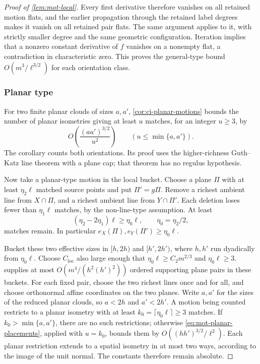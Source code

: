 \begin{proof}[Proof of \cref{lem:mot-local}]
Every first derivative therefore vanishes on all retained motion flats, and the earlier propagation through the retained label degrees makes it vanish on all retained pair flats.  The same argument applies to it, with strictly smaller degree and the same geometric configuration.  Iteration implies that a nonzero constant derivative of $f$ vanishes on a nonempty flat, a contradiction in characteristic zero.  This proves the general-type bound $O(m^3/\ell^{3/2})$ for each orientation class.

\subsubsection{Planar type}

For two finite planar clouds of sizes $a,a'$, \cref{cor:ci-planar-motions} bounds the number of planar isometries giving at least $u$ matches, for an integer $u\ge3$, by
\begin{equation}
\label{eq:mot-planar-placements}
 O\left(\frac{(aa')^{3/2}}{u^2}\right)
 \qquad (u\le\min\{a,a'\}).
\end{equation}
The corollary counts both orientations.  Its proof uses the higher-richness Guth--Katz line theorem \cite[Theorem~4.5]{guthkatz2015} with a plane cap; that theorem has no regulus hypothesis.

Now take a planar-type motion in the local bucket.  Choose a plane $\Pi$ with at least $\eta_2\ell$ matched source points and put $\Pi'=g\Pi$.  Remove a richest ambient line from $X\cap\Pi$, and a richest ambient line from $Y\cap\Pi'$. Each deletion loses fewer than $\eta_1\ell$ matches, by the non-line-type assumption.  At least
\[
 (\eta_2-2\eta_1)\ell\ge\eta_0\ell,
 \qquad \eta_0=\eta_2/2,
\]
matches remain.  In particular $e_X(\Pi),e_Y(\Pi')\ge\eta_0\ell$.

Bucket these two effective sizes in $[h,2h)$ and $[h',2h')$, where $h,h'$ run dyadically from $\eta_0\ell$. Choose $C_{\mathrm{loc}}$ also large enough that $\eta_0\ell\ge C_2m^{2/3}$ and $\eta_0\ell\ge3$.  supplies at most $O(m^4/(h^2(h')^2))$ ordered supporting plane pairs in these buckets.  For each fixed pair, choose the two richest lines once and for all, and choose orthonormal affine coordinates on the two planes.  Write $a,a'$ for the sizes of the reduced planar clouds, so $a<2h$ and $a'<2h'$.  A motion being counted restricts to a planar isometry with at least $k_0=\lceil\eta_0\ell\rceil\ge3$ matches.  If $k_0>\min\{a,a'\}$, there are no such restrictions; otherwise \eqref{eq:mot-planar-placements}, applied with $u=k_0$, bounds them by $O((hh')^{3/2}/\ell^2)$.  Each planar restriction extends to a spatial isometry in at most two ways, according to the image of the unit normal.  The constants therefore remain absolute.


\end{proof}
